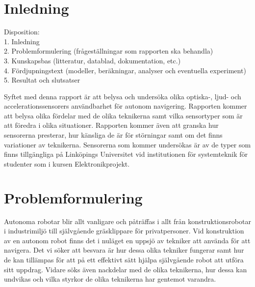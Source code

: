 \documentclass[a4paper,12pt,fleqn]{article}
\begin{document}
\addto\captionsswedish{\renewcommand{\contentsname}{Innehållsförteckning}}

\tableofcontents
\thispagestyle{fancy}
\newpage

\section{Inledning}

Disposition: 
\\
1. Inledning 
\\
2. Problemformulering (frågeställningar som rapporten ska behandla) 
\\
3. Kunskapsbas (litteratur, datablad, dokumentation, etc.) 
\\
4. Fördjupningstext (modeller, beräkningar, analyser och eventuella experiment) 
\\
5. Resultat och slutsatser 

Syftet med denna rapport är att belysa och undersöka olika optiska-, ljud- och accelerationssensorers användbarhet för autonom navigering.
Rapporten kommer att belysa olika fördelar med de olika teknikerna samt vilka sensortyper som är att föredra i olika situationer.
Rapporten kommer även att granska hur sensorerna presterar, hur känsliga de är för störningar samt om det finns variationer av teknikerna.
Sensorerna som kommer undersökas är av de typer som finns tillgängliga på Linköpings Universitet vid institutionen för systemteknik för studenter som i kursen Elektronikprojekt.


\section{Problemformulering}
Autonoma robotar blir allt vanligare och påträffas i allt från konstruktionsrobotar i industrimiljö till självgående gräsklippare för privatpersoner.
Vid konstruktion av en autonom robot finns det i nuläget  en uppsjö av tekniker att använda för att navigera. Det vi söker att besvara är hur dessa olika tekniker fungerar samt hur de kan tillämpas för att på ett effektivt sätt hjälpa självgående robot att utföra sitt uppdrag.
Vidare söks även nackdelar med de olika teknikerna, hur dessa kan undvikas och vilka styrkor de olika teknikerna har gentemot varandra.
\end{document}
